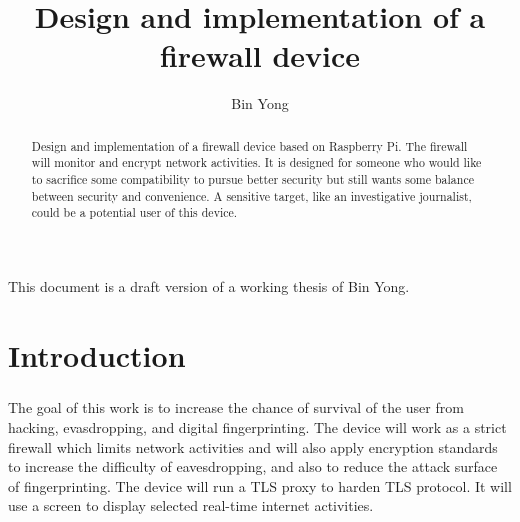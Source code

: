 \documentclass[mscthesis]{usiinfthesis}
\title{Design and implementation of a firewall device} %
\author{Bin Yong} %
\begin{document}
\maketitle %

\frontmatter %

\begin{abstract}
  \paragraph{}
  Design and implementation of a firewall device based on Raspberry Pi. The firewall will monitor and encrypt network activities. It is designed for someone who would like to sacrifice some compatibility to pursue better security but still wants some balance between security and convenience. A sensitive target, like an investigative journalist, could be a potential user of this device.

\end{abstract}

\begin{acknowledgements}
  \paragraph{}
  This document is a draft version of a working thesis of Bin Yong.
\end{acknowledgements}

\tableofcontents
\listoffigures %
\listoftables %

\mainmatter

\chapter{Introduction}
\paragraph{}
The goal of this work is to increase the chance of survival of the user from hacking, evasdropping, and digital fingerprinting. The device will work as a strict firewall which limits network activities and will also apply encryption standards to increase the difficulty of eavesdropping, and also to reduce the attack surface of fingerprinting. The device will run a TLS proxy to harden TLS protocol. It will use a screen to display selected real-time internet activities.
\end{document}
